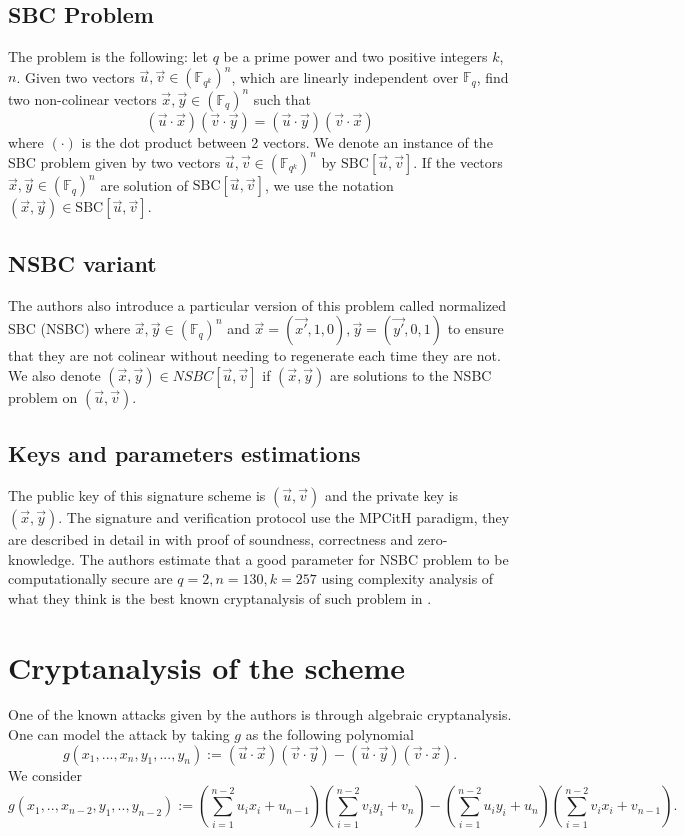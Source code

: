 \documentclass[english]{article}
\begin{document}
		\subsection{SBC Problem}
		The problem is the following: let $q$ be a prime power and two positive integers $k$, $n$.
		\newline
		Given two vectors $\vec{u}, \vec{v} \in (\mathbb{F}_{q^k})^n$, which are linearly independent over $\mathbb{F}_q$, find two non-colinear vectors $\vec{x}, \vec{y} \in (\mathbb{F}_q)^n$ such that $$(\vec{u} \cdot \vec{x})(\vec{v} \cdot \vec{y}) = (\vec{u} \cdot \vec{y})(\vec{v} \cdot \vec{x})$$
		where $(\cdot)$ is the dot product between 2 vectors.
		We denote an instance of the SBC problem given by two vectors $\vec{u}, \vec{v} \in (\mathbb{F}_{q^k})^n$ by $\text{SBC}[\vec{u}, \vec{v}]$. If the vectors $\vec{x},\vec{y} \in (\mathbb{F}_q)^n$ are solution of $\text{SBC}[\vec{u},\vec{v}]$, we use the notation $(\vec{x}, \vec{y}) \in \text{SBC}[\vec{u}, \vec{v}]$.
		
		\subsection{NSBC variant}
		
		The authors also introduce a particular version of this problem called normalized SBC (NSBC) where $\vec{x}, \vec{y} \in (\mathbb{F}_q)^n$ and
		$\vec{x} = (\vec{x'}, 1, 0), \vec{y} = (\vec{y'}, 0, 1)$ to ensure that they are not colinear without needing to regenerate each time they are not. We also denote $(\vec{x}, \vec{y}) \in NSBC[\vec{u}, \vec{v}]$ if $(\vec{x}, \vec{y})$ are solutions to the NSBC problem on $(\vec{u}, \vec{v})$.
 		
 		\subsection{Keys and parameters estimations}
		The public key of this signature scheme is $(\vec{u},\vec{v})$ and the private key is $(\vec{x}, \vec{y})$.
		The signature and verification protocol use the MPCitH paradigm, they are described in detail in \cite{HJ23} with proof of soundness, correctness and zero-knowledge.
		The authors estimate that a good parameter for NSBC problem to be computationally secure are $q = 2, n = 130, k = 257$ using complexity analysis of what they think is the best known cryptanalysis of such problem in \cite{FSS11}.
		
		\section{Cryptanalysis of the scheme}
		One of the known attacks given by the authors is through algebraic cryptanalysis.
		One can model the attack by taking $g$ as the following polynomial
		$$
		g(x_1,...,x_n,y_1,...,y_n) := (\vec{u} \cdot \vec{x})(\vec{v} \cdot \vec{y}) - (\vec{u} \cdot \vec{y})(\vec{v} \cdot \vec{x}).
		$$
		We consider
		$$
		g(x_1,..,x_{n-2},y_1,..,y_{n-2}) := (\sum_{i = 1}^{n-2}u_{i}x_{i} + u_{n-1})(\sum_{i = 1}^{n-2}v_{i}y_{i} + v_{n}) - (\sum_{i = 1}^{n-2}u_{i}y_{i} + u_{n})(\sum_{i = 1}^{n-2}v_{i}x_{i} + v_{n-1}).
		$$
		
\end{document}
